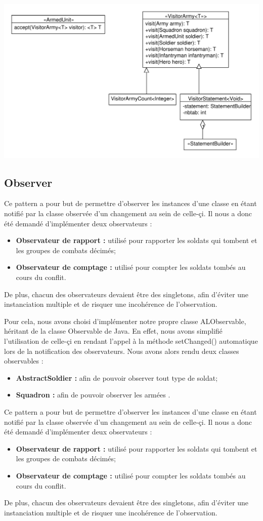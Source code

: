 \documentclass[12pt]{article}
\begin{document}
\includegraphics[scale=0.75]{../UML/Visitor}


\subsection{Observer}
Ce pattern a pour but de permettre d'observer les instances d'une classe en étant notifié par la classe observée d'un changement au sein de celle-çi. Il nous a donc été demandé d'implémenter deux observateurs :
\begin{itemize}
\item \textbf{Observateur de rapport :} utilisé pour rapporter les soldats qui tombent et les groupes de combats décimés; 
\item \textbf{Observateur de comptage :} utilisé pour compter les soldats tombés au cours du conflit. 
\end{itemize}
De plus, chacun des observateurs devaient être des singletons, afin d'éviter une instanciation multiple et de risquer une incohérence de l'observation.

Pour cela, nous avons choisi d'implémenter notre propre classe ALObservable, héritant de la classe Observable de Java. En effet, nous avons simplifié l'utilisation de celle-çi en rendant l'appel à la méthode setChanged() automatique lors de la notification des observateurs.
Nous avons alors rendu deux classes observables :
\begin{itemize}
\item \textbf{AbstractSoldier :} afin de pouvoir observer tout type de soldat;
\item \textbf{Squadron :} afin de pouvoir observer les armées .
\end{itemize}

Ce pattern a pour but de permettre d'observer les instances d'une classe en étant notifié par la classe observée d'un changement au sein de celle-çi. Il nous a donc été demandé d'implémenter deux observateurs :
\begin{itemize}
\item \textbf{Observateur de rapport :} utilisé pour rapporter les soldats qui tombent et les groupes de combats décimés; 
\item \textbf{Observateur de comptage :} utilisé pour compter les soldats tombés au cours du conflit. 
\end{itemize}
De plus, chacun des observateurs devaient être des singletons, afin d'éviter une instanciation multiple et de risquer une incohérence de l'observation.
\end{document}
